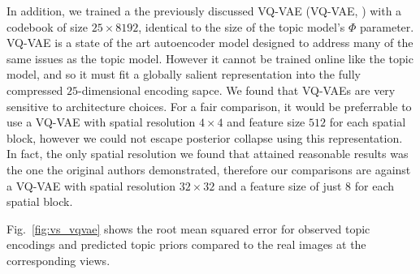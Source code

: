 In addition, we trained a the previously discussed VQ-VAE (VQ-VAE, \citep{vqvae2017}) with a codebook of size $25 \times 8192$, identical to the size of the topic model's $\Phi$ parameter. VQ-VAE is a state of the art autoencoder model designed to address many of the same issues as the topic model. However it cannot be trained online like the topic model, and so it must fit a globally salient representation into the fully compressed $25$-dimensional encoding sapce. We found that VQ-VAEs are very sensitive to architecture choices. For a fair comparison, it would be preferrable to use a VQ-VAE with spatial resolution $4 \times 4$ and feature size $512$ for each spatial block, however we could not escape posterior collapse using this representation. In fact, the only spatial resolution we found that attained reasonable results was the one the original authors demonstrated, therefore our comparisons are against a VQ-VAE with spatial resolution $32 \times 32$ and a feature size of just $8$ for each spatial block.

Fig.~\ref{fig:vs_vqvae} shows the root mean squared error for observed topic encodings and predicted topic priors compared to the real images at the corresponding views.

